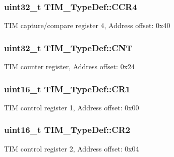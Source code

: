 \subsubsection[{\texorpdfstring{C\+C\+R4}{CCR4}}]{ uint32\+\_\+t T\+I\+M\+\_\+\+Type\+Def\+::\+C\+C\+R4}\hypertarget{struct_t_i_m___type_def_a5ba381c3f312fdf5e0b4119641b3b0aa}{}\label{struct_t_i_m___type_def_a5ba381c3f312fdf5e0b4119641b3b0aa}
T\+IM capture/compare register 4, Address offset\+: 0x40 
\subsubsection[{\texorpdfstring{C\+NT}{CNT}}]{ uint32\+\_\+t T\+I\+M\+\_\+\+Type\+Def\+::\+C\+NT}\hypertarget{struct_t_i_m___type_def_a6fdd2a7fb88d28670b472aaac0d9d262}{}\label{struct_t_i_m___type_def_a6fdd2a7fb88d28670b472aaac0d9d262}
T\+IM counter register, Address offset\+: 0x24 
\subsubsection[{\texorpdfstring{C\+R1}{CR1}}]{ uint16\+\_\+t T\+I\+M\+\_\+\+Type\+Def\+::\+C\+R1}\hypertarget{struct_t_i_m___type_def_a410988826004fdd21d55071215144ba9}{}\label{struct_t_i_m___type_def_a410988826004fdd21d55071215144ba9}
T\+IM control register 1, Address offset\+: 0x00 
\subsubsection[{\texorpdfstring{C\+R2}{CR2}}]{ uint16\+\_\+t T\+I\+M\+\_\+\+Type\+Def\+::\+C\+R2}\hypertarget{struct_t_i_m___type_def_a954eb69fd4e2e6b43ba6c80986f691d8}{}\label{struct_t_i_m___type_def_a954eb69fd4e2e6b43ba6c80986f691d8}
T\+IM control register 2, Address offset\+: 0x04 
